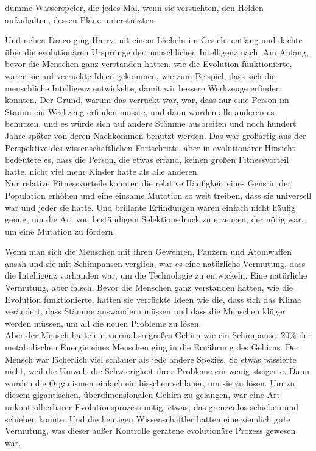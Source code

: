 {dumme Wasserspeier, die jedes Mal, wenn sie versuchten, den Helden aufzuhalten, dessen Pläne unterstützten.

Und neben Draco ging Harry mit einem Lächeln im Gesicht entlang und dachte über die evolutionären Ursprünge der menschlichen Intelligenz nach. Am Anfang, bevor die Menschen ganz verstanden hatten, wie die Evolution funktionierte, waren sie auf verrückte Ideen gekommen, wie zum Beispiel, dass sich die menschliche Intelligenz entwickelte, damit wir bessere Werkzeuge erfinden konnten. Der Grund, warum das verrückt war, war, dass nur eine Person im Stamm ein Werkzeug erfinden musste, und dann würden alle anderen es benutzen, und es würde sich auf andere Stämme ausbreiten und noch hundert Jahre später von deren Nachkommen benutzt werden. Das war großartig aus der Perspektive des wissenschaftlichen Fortschritts, aber in evolutionärer Hinsicht bedeutete es, dass die Person, die etwas erfand, keinen großen Fitnessvorteil hatte, nicht viel mehr Kinder hatte als alle anderen.\\ Nur relative Fitnessvorteile konnten die relative Häufigkeit eines Gens in der Population erhöhen und eine einsame Mutation so weit treiben, dass sie universell war und jeder sie hatte. Und brillante Erfindungen waren einfach nicht häufig genug, um die Art von beständigem Selektionsdruck zu erzeugen, der nötig war, um eine Mutation zu fördern.

Wenn man sich die Menschen mit ihren Gewehren, Panzern und Atomwaffen ansah und sie mit Schimpansen verglich, war es eine natürliche Vermutung, dass die Intelligenz vorhanden war, um die Technologie zu entwickeln. Eine natürliche Vermutung, aber falsch. Bevor die Menschen ganz verstanden hatten, wie die Evolution funktionierte, hatten sie verrückte Ideen wie die, dass sich das Klima verändert, dass Stämme auswandern müssen und dass die Menschen klüger werden müssen, um all die neuen Probleme zu lösen.\\ Aber der Mensch hatte ein viermal so großes Gehirn wie ein Schimpanse. 20\% der metabolischen Energie eines Menschen ging in die Ernährung des Gehirns. Der Mensch war lächerlich viel schlauer als jede andere Spezies. So etwas passierte nicht, weil die Umwelt die Schwierigkeit ihrer Probleme ein wenig steigerte. Dann wurden die Organismen einfach ein bisschen schlauer, um sie zu lösen. Um zu diesem gigantischen, überdimensionalen Gehirn zu gelangen, war eine Art unkontrollierbarer Evolutionsprozess nötig, etwas, das grenzenlos schieben und schieben konnte. Und die heutigen Wissenschaftler hatten eine ziemlich gute Vermutung, was dieser außer Kontrolle geratene evolutionäre Prozess gewesen war.

}
